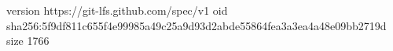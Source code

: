 version https://git-lfs.github.com/spec/v1
oid sha256:5f9df811c655f4e99985a49c25a9d93d2abde55864fea3a3ea4a48e09bb2719d
size 1766

